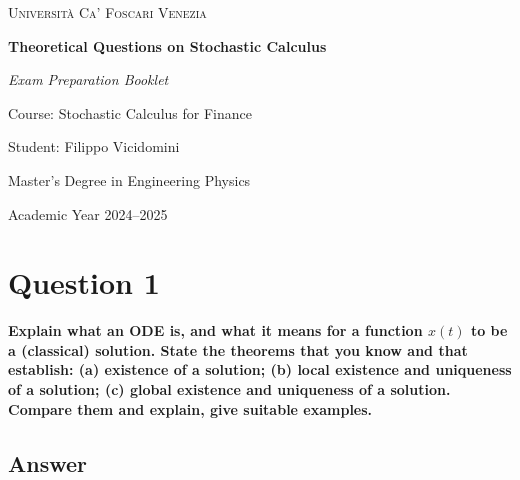 \documentclass[12pt,a4paper]{book}
\theoremstyle{remark}
\begin{document}
\begin{titlepage}
    \centering
    
    {\scshape Università Ca' Foscari Venezia \par}
 
    \vspace{2cm}
    \vfill
    {\Huge\bfseries Theoretical Questions on Stochastic Calculus \par}
    \vspace{1.5cm}
    {\Large\itshape Exam Preparation Booklet\par}
    
    \vspace{2cm}
    {\Large Course: Stochastic Calculus for Finance \par}
    \vspace{0.5cm}
 
    
    \vfill
    
    {\large Student: Filippo Vicidomini \par}
    {\large Master’s Degree in Engineering Physics\par}
    
    \vfill
    
    {\large Academic Year 2024--2025 \par}
    
\end{titlepage}


\tableofcontents

\clearpage
\label{sec:Contents}
\setcounter{page}{1}

\newpage
\section{Question 1}
\textbf{Explain what an ODE is, and what it means for a function $x(t)$ to be a (classical) solution. 
State the theorems that you know and that establish: (a) existence of a solution; (b) local existence and uniqueness of a solution; (c) global existence and uniqueness of a solution. 
Compare them and explain, give suitable examples.}

\subsection*{Answer}
\end{document}
